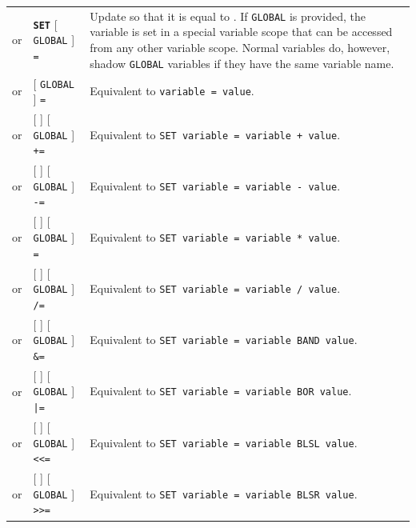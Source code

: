 \documentclass{article}
\def\ttref#1{\ahrefloc{#1}{\tt #1}}
\def\DEFINE#1{{\tt \bf #1}\label{#1}\index{#1}}
\def\t#1{{\tt #1}}
\def\Ob{{\color{red} [ }}
\def\Oe{{\color{red} ] }}
\begin{document}
\begin{tabular}{cp{10in}|p{10in}}
or & \DEFINE{SET} \Ob \t{GLOBAL} \Oe \ttref{variable} \t{=} \ttref{value} &
  Update \ttref{variable} so that it is equal to \ttref{value}. If
  \t{GLOBAL} is provided, the variable is set in a special variable
  scope that can be accessed from any other variable scope. Normal
  variables do, however, shadow \t{GLOBAL} variables if they have the
  same variable name. \\
or & \Ob \t{GLOBAL} \Oe \ttref{variable} \t{=} \ttref{value} &
  Equivalent to \ttref{SET} \t{variable = value}. \\
or & \Ob \ttref{SET} \Oe \Ob \t{GLOBAL} \Oe \ttref{variable} \t{+=} \ttref{value} &
  Equivalent to \t{SET variable = variable + value}. \\
or & \Ob \ttref{SET} \Oe \Ob \t{GLOBAL} \Oe \ttref{variable} \t{-=} \ttref{value} &
  Equivalent to \t{SET variable = variable - value}. \\
or & \Ob \ttref{SET} \Oe \Ob \t{GLOBAL} \Oe \ttref{variable} \t{*=} \ttref{value} &
  Equivalent to \t{SET variable = variable * value}. \\
or & \Ob \ttref{SET} \Oe \Ob \t{GLOBAL} \Oe \ttref{variable} \t{/=} \ttref{value} &
  Equivalent to \t{SET variable = variable / value}. \\
or & \Ob \ttref{SET} \Oe \Ob \t{GLOBAL} \Oe \ttref{variable} \t{\&=} \ttref{value} &
  Equivalent to \t{SET variable = variable BAND value}. \\
or & \Ob \ttref{SET} \Oe \Ob \t{GLOBAL} \Oe \ttref{variable} \t{|=} \ttref{value} &
  Equivalent to \t{SET variable = variable BOR value}. \\
or & \Ob \ttref{SET} \Oe \Ob \t{GLOBAL} \Oe \ttref{variable} \t{<<=} \ttref{value} &
  Equivalent to \t{SET variable = variable BLSL value}. \\
or & \Ob \ttref{SET} \Oe \Ob \t{GLOBAL} \Oe \ttref{variable} \t{>>=} \ttref{value} &
  Equivalent to \t{SET variable = variable BLSR value}. \\


\end{tabular}
\end{document}
